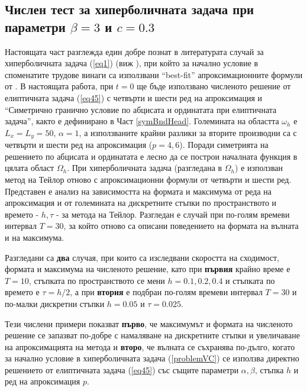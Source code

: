 \documentclass[a4paper]{article}
\newcommand{\rf}[1]{(\ref{#1})}
\theoremstyle{remark}
\begin{document}
\begin{large}
\subsection{Числен тест за хиперболичната задача при параметри $\beta = 3$ и $c=0.3$} \label{numTestbt3c03}
Настоящата част разглежда един добре познат в литературата случай за хиперболичната задача \rf{eq1} (виж \cite{ref21, ref20, ref23, ref22} ), при който за начално условие в споменатите трудове винаги са използвани ``best-fit'' апроксимационните формули от \cite{ref15}. В настоящата работа, при $t=0$ ще бъде използвано численото решение от елиптичната задача \rf{eq45} с четвърти и шести ред на апроксимация  и  ``Симетрично гранично условие по абцисата и ординатата при елиптичната задача'', както е дефинирано в Част \ref{symBndHead}. Големината на областта $\omega_h$ е $L_x = L_y = 50$, $\alpha = 1$, а използваните крайни разлики за вторите производни са с четвърти и шести ред на апроксимация ($p=4, 6$). Поради симетрията на решението по абцисата и ординатата е лесно да се построи началната функция в цялата област $\Omega_h$. При хиперболичната задача (разгледана в $\Omega_h$) е използван метод на Тейлор отново с апроксимационни формули от четвърти и шести ред. Представен е анализ на зависимостта на формата и максимума от реда на апроксимация и от големината на дискретните стъпки по пространството и времето - $h, \tau$ - за метода на Тейлор. Разгледан е случай при по-голям времеви интервал $T=30$, за който отново са описани поведението на формата на вълната и на максимума.

Разгледани са \textbf{два} случая, при които са изследвани скоростта на сходимост, формата и максимума на численото решение, като при \textbf{първия} крайно време е {\boldmath $T=10$}, стъпката по пространството се мени {\boldmath $h=0.1, 0.2, 0.4$} и стъпката по времето е $\tau = h/2$, а при \textbf{втория} е подбран по-голям времеви интервал {\boldmath $T=30$} и по-малки дискретни стъпки {\boldmath $h=0.05$} и {\boldmath $\tau=0.025$}. 

Тези числени примери показват \textbf{първо}, че максимумът и формата на численото решение се запазват по-добре с намаляване на дискретните стъпки и увеличаване на апроксимацията на метода и \textbf{второ}, че вълната се съхранява по-дълго, когато за начално условие в хиперболичната задача \rf{problemVC} се използва директно решението от елиптичната задача \rf{eq45} със същите параметри $\alpha, \beta$, стъпка $h$ и ред на апроксимация $p$.


\end{large}
\end{document}

